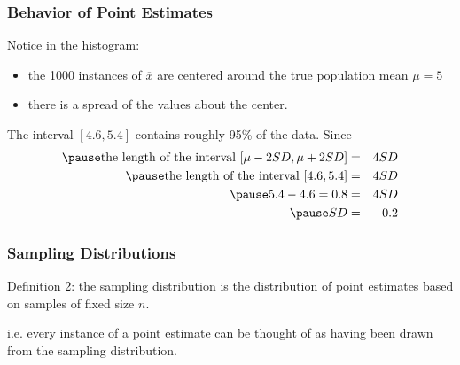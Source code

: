 \documentclass[handout]{beamer}
\newcommand{\blue}[1]{\textcolor{blue2}{#1}}
\newcommand{\xbar}{\overline{x}}
\begin{document}
\begin{frame}
\frametitle{Behavior of Point Estimates}
Notice in the histogram:
\begin{itemize}
\pause \item the 1000 instances of $\xbar$ are centered around the true population mean $\mu=5$
\pause \item there is a spread of the values about the center.
\end{itemize}

\vspace{0.5cm}

\pause The interval $[4.6, 5.4]$ contains roughly 95\% of the data.  Since
\begin{eqnarray*}
\pause \mbox{the length of the interval } [\mu - 2 SD, \mu + 2SD] &=& 4SD\\
\pause \mbox{the length of the interval } [4.6, 5.4] &=& 4SD\\
\pause 5.4 - 4.6 = 0.8 &=& 4SD\\
\pause SD &=& 0.2
\end{eqnarray*}


\end{frame}




\begin{frame}[fragile]
\frametitle{Sampling Distributions}

\blue{Definition 2}: the \blue{sampling distribution} is the distribution of point estimates based on samples of fixed size $n$.  

\pause \vspace{0.5cm}

i.e. every instance of a point estimate can be thought of as having been drawn from the sampling distribution.  


\end{frame}
\end{document}
